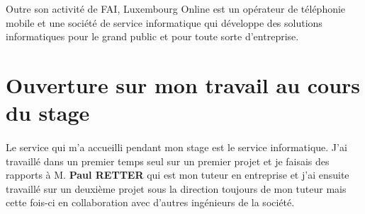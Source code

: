 Outre son activité de \gls{FAI}, Luxembourg Online est un opérateur de téléphonie mobile et une société de service informatique qui développe des solutions informatiques pour le grand public et pour toute sorte d'entreprise.

\section{Ouverture sur mon travail au cours du stage}
\paragraph*{}
Le service qui m'a accueilli pendant mon stage est le service informatique. J'ai travaillé dans un premier temps seul sur un premier projet et je faisais des rapports à M. \textbf{Paul RETTER} qui est mon tuteur en entreprise et j'ai ensuite travaillé sur un deuxième projet sous la direction toujours de mon tuteur  mais cette fois-ci en collaboration avec d'autres ingénieurs de la société.